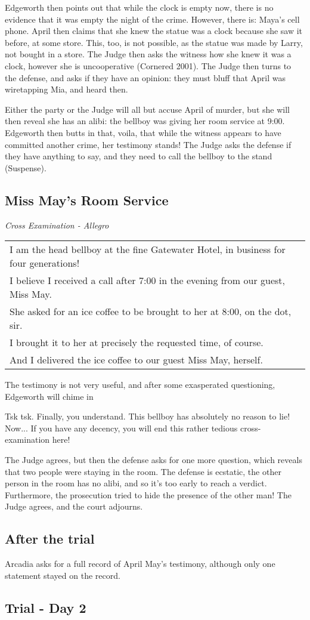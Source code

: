 Edgeworth then points out that while the clock is empty now, there is no evidence that it was empty the night of the crime. However, there is: Maya's cell phone. April then claims that she knew the statue was a clock because she saw it before, at some store. This, too, is not possible, as the statue was made by Larry, not bought in a store. The Judge then asks the witness how she knew it was a clock, however she is uncooperative (Cornered 2001). The Judge then turns to the defense, and asks if they have an opinion: they must bluff that April was wiretapping Mia, and heard then.

Either the party or the Judge will all but accuse April of murder, but she will then reveal she has an alibi: the bellboy was giving her room service at 9:00. Edgeworth then butts in that, voila, that while the witness appears to have committed another crime, her testimony stands! The Judge asks the defense if they have anything to say, and they need to call the bellboy to the stand (Suspense).

\subsection{Miss May's Room Service}
\textit{Cross Examination - Allegro}\\
\begin{tabular}{p{11cm}}
I am the head bellboy at the fine Gatewater Hotel, in business for four generations!\\
I believe I received a call after 7:00 in the evening from our guest, Miss May.\\
She asked for an ice coffee to be brought to her at 8:00, on the dot, sir.\\
I brought it to her at precisely the requested time, of course.\\
And I delivered the ice coffee to our guest Miss May, herself. \end{tabular}

The testimony is not very useful, and after some exasperated questioning, Edgeworth will chime in 
\begin{center}
Tsk tsk. Finally, you understand. This bellboy has absolutely no reason to lie! Now... If you have any decency, you will end this rather tedious cross-examination here! 
\end{center}

The Judge agrees, but then the defense asks for one more question, which reveals that two people were staying in the room. The defense is ecstatic, the other person in the room has no alibi, and so it's too early to reach a verdict. Furthermore, the prosecution tried to hide the presence of the other man! The Judge agrees, and the court adjourns.

\subsection{After the trial}
Arcadia asks for a full record of April May's testimony, although only one statement stayed on the record.


\subsection{Trial - Day 2}
